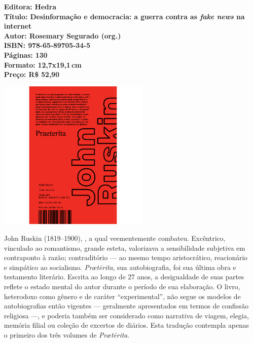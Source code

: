 \vfill
\noindent\begin{minipage}[c]{1\linewidth}
{\small\textbf{
\hspace*{-.1cm}Editora: Hedra\\
Título: Desinformação e democracia: a guerra contra as \textit{fake news} na internet\\
Autor: Rosemary Segurado (org.)\\
ISBN: 978-65-89705-34-5\\
Páginas: 130\\
Formato: 12,7x19,1\,cm\\
Preço: R\$ 52,90\\
}}
\end{minipage}
\pagebreak

\begin{center}
\hspace*{.5cm}\includegraphics[width=74mm]{./CAPAS/HEDRA_RUSKIN.jpg}
\end{center}
\hspace*{-7cm}\hrulefill\hspace*{-7cm}
\medskip

\noindent{}John Ruskin (1819--1900), , a qual veementemente combateu. Excêntrico, vinculado ao romantismo, grande esteta, valorizava a sensibilidade subjetiva em contraponto à razão; contraditório --- ao mesmo tempo aristocrático, reacionário e simpático ao socialismo. \textit{Prætērita}, sua autobiografia, foi sua última obra e testamento literário. Escrita ao longo de 27 anos, a desigualdade de suas partes reflete o estado mental do autor durante o período de sua elaboração. O livro, heterodoxo como gênero e de caráter ``experimental'', não segue os modelos de autobiografias então vigentes --- geralmente apresentados em termos de confissão religiosa ---, e poderia também ser considerado como narrativa de viagem, elegia, memória filial ou coleção de excertos de diários. Esta tradução contempla apenas o primeiro dos três volumes de \textit{Prætērita}.

